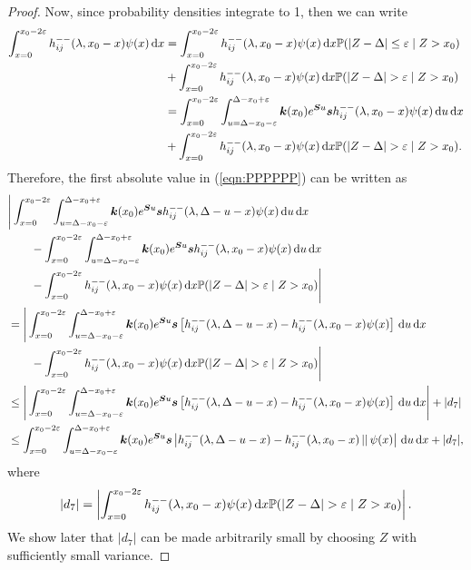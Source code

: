 \begin{proof}
	Now, since probability densities integrate to 1, then we can write 
	\begin{align*}
		\int_{x=0}^{x_0-2\varepsilon} h_{ij}^{--}(\lambda, x_0 - x)\psi(x)\wrt x
		&=\int_{x=0}^{x_0-2\varepsilon} h_{ij}^{--}(\lambda, x_0 - x)\psi(x)\wrt x\mathbb P(|Z-\Delta|\leq \varepsilon\mid Z>x_0) 
		\\&{}+ \int_{x=0}^{x_0-2\varepsilon} h_{ij}^{--}(\lambda, x_0 - x)\psi(x)\wrt x\mathbb P(|Z-\Delta|> \varepsilon\mid Z>x_0)
		\\&=\int_{x=0}^{x_0-2\varepsilon} \int_{u=\Delta-x_0-\varepsilon}^{\Delta-x_0+\varepsilon} \bs k(x_0)e^{\bs Su}\bs s h_{ij}^{--}(\lambda, x_0 - x)\psi(x)\wrt u\wrt x
		\\&{}+ \int_{x=0}^{x_0-2\varepsilon} h_{ij}^{--}(\lambda, x_0 - x)\psi(x)\wrt x\mathbb P(|Z-\Delta|> \varepsilon\mid Z>x_0).
	\end{align*}
	Therefore, the first absolute value in (\ref{eqn:PPPPPP}) can be written as 
	\begin{align}
		\nonumber &\Bigg| \int_{x=0}^{x_0-2\varepsilon}\int_{u=\Delta-x_0-\varepsilon}^{\Delta-x_0+\varepsilon} \bs k(x_0)e^{\bs Su}\bs s h_{ij}^{--}(\lambda, \Delta - u - x) \psi(x) \wrt u   \wrt x 
		\\\nonumber &\qquad{} - \int_{x=0}^{x_0-2\varepsilon} \int_{u=\Delta-x_0-\varepsilon}^{\Delta-x_0+\varepsilon} \bs k(x_0)e^{\bs Su}\bs s h_{ij}^{--}(\lambda, x_0 - x)\psi(x)\wrt u\wrt x
		\\\nonumber &\qquad{}- \int_{x=0}^{x_0-2\varepsilon} h_{ij}^{--}(\lambda, x_0 - x)\psi(x)\wrt x\mathbb P(|Z-\Delta|> \varepsilon\mid Z>x_0)\Bigg|
		\\\nonumber &=\Bigg| \int_{x=0}^{x_0-2\varepsilon}\int_{u=\Delta-x_0-\varepsilon}^{\Delta-x_0+\varepsilon} \bs k(x_0)e^{\bs Su}\bs s \left[h_{ij}^{--}(\lambda, \Delta - u - x) -  h_{ij}^{--}(\lambda, x_0 - x)\psi(x)\right]\wrt u\wrt x
		\\\nonumber &\qquad{}- \int_{x=0}^{x_0-2\varepsilon} h_{ij}^{--}(\lambda, x_0 - x)\psi(x)\wrt x\mathbb P(|Z-\Delta|> \varepsilon\mid Z>x_0)\Bigg|
		\\&\leq \Bigg| \int_{x=0}^{x_0-2\varepsilon}\int_{u=\Delta-x_0-\varepsilon}^{\Delta-x_0+\varepsilon} \bs k(x_0)e^{\bs Su}\bs s \left[h_{ij}^{--}(\lambda, \Delta - u - x) -  h_{ij}^{--}(\lambda, x_0 - x)\psi(x)\right]\wrt u\wrt x\Bigg| + |d_7| \nonumber 
		\\&\leq  \int_{x=0}^{x_0-2\varepsilon}\int_{u=\Delta-x_0-\varepsilon}^{\Delta-x_0+\varepsilon} \bs k(x_0)e^{\bs Su}\bs s \left|h_{ij}^{--}(\lambda, \Delta - u - x) -  h_{ij}^{--}(\lambda, x_0 - x)\left|\right|\psi(x)\right|\wrt u\wrt x + |d_7|, \label{eqn: ajkhvakjhdannvnnvnvn}
	\end{align}
	where 
	\[|d_7|=\left| \int_{x=0}^{x_0-2\varepsilon} h_{ij}^{--}(\lambda, x_0 - x)\psi(x)\wrt x\mathbb P(|Z-\Delta|> \varepsilon\mid Z>x_0)\right|.\]
	We show later that \(|d_7|\) can be made arbitrarily small by choosing \(Z\) with sufficiently small variance.


\end{proof}
